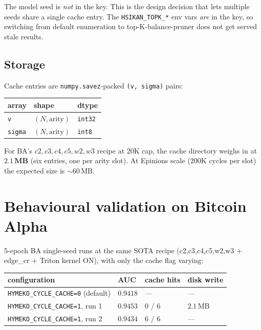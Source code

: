 \documentclass[11pt,a4paper]{article}
\begin{document}
The model seed is \emph{not} in the key.  This is the design
decision that lets multiple seeds share a single cache entry.  The
\texttt{HSIKAN\_TOPK\_*} env vars \emph{are} in the key, so
switching from default enumeration to top-K-balance-pruner does
not get served stale results.

\subsection*{Storage}

Cache entries are \texttt{numpy.savez}-packed
\texttt{(v, sigma)} pairs:

\begin{center}\small
\begin{tabular}{l l l}
\toprule
\textbf{array} & \textbf{shape} & \textbf{dtype} \\
\midrule
\texttt{v}     & $(N, \text{arity})$ & \texttt{int32} \\
\texttt{sigma} & $(N, \text{arity})$ & \texttt{int8}  \\
\bottomrule
\end{tabular}
\end{center}

For BA's $c2,c3,c4,c5,w2,w3$ recipe at $20$K cap, the cache
directory weighs in at $\mathbf{2.1\,\text{MB}}$ (six entries, one
per arity slot).  At Epinions scale ($200$K cycles per slot) the
expected size is $\sim 60\,\text{MB}$.

\section{Behavioural validation on Bitcoin Alpha}

5-epoch BA single-seed runs at the same SOTA recipe
(c2,c3,c4,c5,w2,w3 + edge\_cr + Triton kernel ON), with only the
cache flag varying:

\begin{center}\small
\begin{tabular}{l l l l}
\toprule
\textbf{configuration} & \textbf{AUC} & \textbf{cache hits} & \textbf{disk write} \\
\midrule
\texttt{HYMEKO\_CYCLE\_CACHE=0} (default) & $0.9418$ & --- & --- \\
\texttt{HYMEKO\_CYCLE\_CACHE=1}, run 1    & $0.9453$ & 0 / 6 & $2.1\,$MB \\
\texttt{HYMEKO\_CYCLE\_CACHE=1}, run 2    & $0.9434$ & 6 / 6 & --- \\
\bottomrule
\end{tabular}
\end{center}
\end{document}
